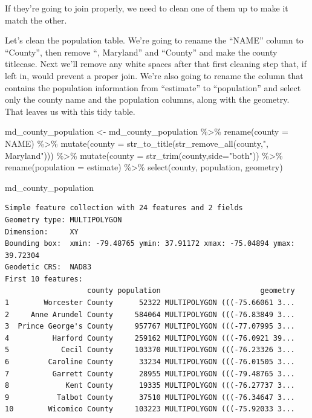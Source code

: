 \documentclass[
  letterpaper,
  DIV=11,
  numbers=noendperiod]{scrreprt}
\newenvironment{Shaded}{\begin{snugshade}}{\end{snugshade}}
\newcommand{\AttributeTok}[1]{\textcolor[rgb]{0.40,0.45,0.13}{#1}}
\newcommand{\FunctionTok}[1]{\textcolor[rgb]{0.28,0.35,0.67}{#1}}
\newcommand{\NormalTok}[1]{\textcolor[rgb]{0.00,0.23,0.31}{#1}}
\newcommand{\OtherTok}[1]{\textcolor[rgb]{0.00,0.23,0.31}{#1}}
\newcommand{\SpecialCharTok}[1]{\textcolor[rgb]{0.37,0.37,0.37}{#1}}
\newcommand{\StringTok}[1]{\textcolor[rgb]{0.13,0.47,0.30}{#1}}
\begin{document}
If they're going to join properly, we need to clean one of them up to
make it match the other.

Let's clean the population table. We're going to rename the ``NAME''
column to ``County'', then remove ``, Maryland'' and ``County'' and make
the county titlecase. Next we'll remove any white spaces after that
first cleaning step that, if left in, would prevent a proper join. We're
also going to rename the column that contains the population information
from ``estimate'' to ``population'' and select only the county name and
the population columns, along with the geometry. That leaves us with
this tidy table.

\begin{Shaded}
\begin{Highlighting}[]
\NormalTok{md\_county\_population }\OtherTok{\textless{}{-}}\NormalTok{ md\_county\_population }\SpecialCharTok{\%\textgreater{}\%}
  \FunctionTok{rename}\NormalTok{(}\AttributeTok{county =}\NormalTok{ NAME) }\SpecialCharTok{\%\textgreater{}\%}
  \FunctionTok{mutate}\NormalTok{(}\AttributeTok{county =} \FunctionTok{str\_to\_title}\NormalTok{(}\FunctionTok{str\_remove\_all}\NormalTok{(county,}\StringTok{", Maryland"}\NormalTok{))) }\SpecialCharTok{\%\textgreater{}\%}
  \FunctionTok{mutate}\NormalTok{(}\AttributeTok{county =} \FunctionTok{str\_trim}\NormalTok{(county,}\AttributeTok{side=}\StringTok{"both"}\NormalTok{)) }\SpecialCharTok{\%\textgreater{}\%}
  \FunctionTok{rename}\NormalTok{(}\AttributeTok{population =}\NormalTok{ estimate) }\SpecialCharTok{\%\textgreater{}\%}
  \FunctionTok{select}\NormalTok{(county, population, geometry)}

\NormalTok{md\_county\_population}
\end{Highlighting}
\end{Shaded}

\begin{verbatim}
Simple feature collection with 24 features and 2 fields
Geometry type: MULTIPOLYGON
Dimension:     XY
Bounding box:  xmin: -79.48765 ymin: 37.91172 xmax: -75.04894 ymax: 39.72304
Geodetic CRS:  NAD83
First 10 features:
                   county population                       geometry
1        Worcester County      52322 MULTIPOLYGON (((-75.66061 3...
2     Anne Arundel County     584064 MULTIPOLYGON (((-76.83849 3...
3  Prince George's County     957767 MULTIPOLYGON (((-77.07995 3...
4          Harford County     259162 MULTIPOLYGON (((-76.0921 39...
5            Cecil County     103370 MULTIPOLYGON (((-76.23326 3...
6         Caroline County      33234 MULTIPOLYGON (((-76.01505 3...
7          Garrett County      28955 MULTIPOLYGON (((-79.48765 3...
8             Kent County      19335 MULTIPOLYGON (((-76.27737 3...
9           Talbot County      37510 MULTIPOLYGON (((-76.34647 3...
10        Wicomico County     103223 MULTIPOLYGON (((-75.92033 3...
\end{verbatim}
\end{document}
